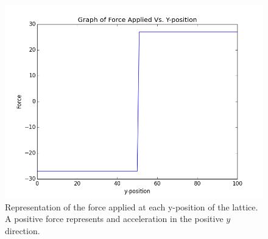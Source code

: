 \documentclass[12pt]{article}
\begin{document}
\begin{figure}[H]
	\centering
	\includegraphics[scale=0.5]{img/forceapplied}
	\caption{Representation of the force applied at each y-position of the lattice. A positive force represents and acceleration in the positive $y$ direction.}
	\label{forceapplied}
\end{figure}
\end{document}
